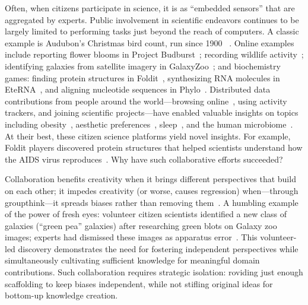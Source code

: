 Often, when citizens participate in science, it is as “embedded sensors” that 
are aggregated by experts. Public involvement in scientific endeavors continues
to be largely limited to performing tasks just beyond the reach of computers.
A classic example is Audubon’s Christmas bird count, run since 1900
~\cite{Audubon2016}. Online examples include reporting flower blooms in
Project Budburst~\cite{BoulderColorado2016}; recording wildlife activity~\cite{Faridani2009a};
identifying galaxies from satellite imagery in GalaxyZoo~\cite{Zooniverse2007}; 
and biochemistry games: finding protein structures in Foldit~\cite{Cooper2010}, 
synthesizing RNA molecules in EteRNA~\cite{Lee2014}, and aligning 
nucleotide sequences in Phylo~\cite{Kawrykow2012}. Distributed 
data contributions from people around the world—browsing online~\cite{Coviello2014}, using activity trackers, and joining scientific projects—have enabled valuable insights on topics including 
obesity~\cite{Althoff2017}, aesthetic preferences~\cite{Reinecke2014a}, sleep~\cite{F.lux2019}, and the human microbiome~\cite{McDonald2018a}. At their
best, these citizen science platforms yield novel insights.
For example, Foldit players discovered protein structures
that helped scientists understand how the AIDS virus reproduces~\cite{Coren2011}. Why have such collaborative efforts succeeded?


Collaboration benefits creativity when it brings different
 perspectives that build on each other; it impedes creativity (or worse, causes regression) 
when—through groupthink—it spreads biases rather than removing them~\cite{starbird2014rumors}. 
A humbling example of the power of fresh eyes: volunteer citizen scientists identified a new class of 
galaxies (“green pea” galaxies) after researching green blots on Galaxy zoo images; 
experts had dismissed these images as apparatus error~\cite{cardamone2009galaxy}.
This volunteer-led discovery demonstrates the need for fostering independent perspectives 
while simultaneously cultivating sufficient knowledge for meaningful domain contributions. 
Such collaboration requires strategic isolation: roviding just enough scaffolding to keep 
biases independent, while not stifling original ideas for bottom-up knowledge creation.



